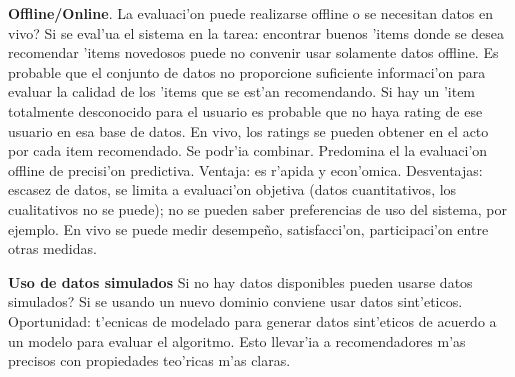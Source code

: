 \documentclass[11pt]{article}
\begin{document}
\bigskip
\noindent
\textbf{Offline/Online}.
La evaluaci'on puede realizarse offline o se necesitan datos en vivo? Si se eval'ua el sistema en la tarea: encontrar buenos 'items donde se desea recomendar 'items novedosos puede no convenir usar solamente datos offline. Es probable que el conjunto de datos no proporcione suficiente informaci'on para evaluar la calidad de los 'items que se est'an recomendando. Si hay un 'item totalmente desconocido para el usuario es probable que no haya rating de ese usuario en esa base de datos. En vivo, los ratings se pueden obtener en el acto por cada item recomendado. Se podr'ia combinar. Predomina el la evaluaci'on offline de precisi'on predictiva. Ventaja: es r'apida y econ'omica. Desventajas: escasez de datos, se limita a evaluaci'on objetiva (datos cuantitativos, los cualitativos no se puede); no se pueden saber preferencias de uso del sistema, por ejemplo. En vivo se puede medir desempe\~{n}o, satisfacci'on, participaci'on entre otras medidas.

\bigskip
\noindent
\textbf{Uso de datos simulados}
Si no hay datos disponibles \textquestiondown pueden usarse datos simulados? Si se usando un nuevo dominio conviene usar datos sint'eticos. Oportunidad: t'ecnicas de modelado para generar datos sint'eticos de acuerdo a un modelo para evaluar el algoritmo. Esto llevar'ia a recomendadores m'as precisos con propiedades teo'ricas m'as claras.
\end{document}
